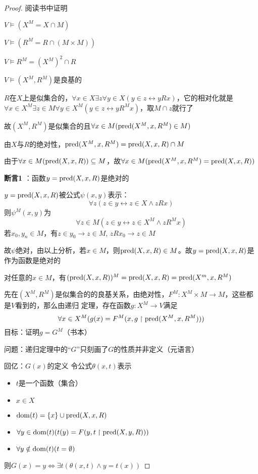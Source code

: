 \documentclass[11pt]{article}
\begin{document}
\begin{proof}
阅读书中证明

\(V\vDash(X^M=X\cap M)\)

\(V\vDash(R^M=R\cap(M\times M))\)

\(V\vDash R^M=(X^M)^2\cap R\)

\(V\vDash(X^M,R^M)\)是良基的


\(R\)在\(X\)上是似集合的，\(\forall x\in X\exists z\forall y\in X(y\in z\leftrightarrow yRx)\)，它的相对化就是
\(\forall x\in X^M\exists z\in M\forall y\in X^M(y\in z\leftrightarrow yR^Mx)\)，取\(M\cap z\)就行了

故\((X^M,R^M)\)是似集合的且\(\forall x\in M(\text{pred}(X^M,x,R^M)\in M)\)

由\(X\)与\(R\)的绝对性，\(\text{pred}(X^M,x,R^M)=\text{pred}(X,x,R)\cap M\)

由于\(\forall x\in M(\text{pred}(X,x,R))\subseteq M\)，故\(\forall x\in M(\text{pred}(X^M,x,R^M)=\text{pred}(X,x,R))\)

\textbf{断言1} ：函数\(y=\text{pred}(X,x,R)\)是绝对的

\(y=\text{pred}(X,x,R)\)被公式\(\psi(x,y)\)表示：
\begin{equation*}
\forall z(z\in y\leftrightarrow z\in X\wedge zRx)
\end{equation*}
则\(\psi^M(x,y)\)为
\begin{equation*}
\forall z\in M(z\in y\leftrightarrow z\in X^M\wedge zR^Mx)
\end{equation*}
若\(x_0,y_n\in M\)，有\(z\in y_0\to z\in M\), \(zRx_0\to z\in M\)

故\(\psi\)绝对，由以上分析，若\(x\in M\)，则\(\text{pred}(X,x,R)\in M\)。故\(y=\text{pred}(X,x,R)\)是作为函数是绝对的

对任意的\(x\in M\)，有\((\text{pred}(X,x,R))^M=\text{pred}(X,x,R)=\text{pred}(X^m,x,R^M)\)

先在\((X^M,R^M)\)是似集合的的良基关系，由绝对性，\(F^M:X^M\times M\to M\)，这些都是\(V\)看到的，那么由递归
定理，存在函数\(g:X^M\to V\)满足
\begin{equation*}
\forall x\in X^M(g(x)=F^M(x,g\upharpoonright\text{pred}(X^M,x,R^M)))
\end{equation*}
目标：证明\(g=G^M\)（书本）

问题：递归定理中的``\(G\)''只刻画了\(G\)的性质并非定义（元语言）

回亿：\(G(x)\)的定义
令公式\(\theta(x,t)\)表示
\begin{itemize}
\item \(t\)是一个函数（集合）
\item \(x\in X\)
\item \(\operatorname{dom}(t)=\{x\}\cup\text{pred}(X,x,R)\)
\item \(\forall y\in\operatorname{dom}(t)(t(y)=F(y,t\upharpoonright\text{pred}(X,y,R)))\)
\item \(\forall y\notin\operatorname{dom}(t)(t=\emptyset)\)
\end{itemize}
则\(G(x)=y\Leftrightarrow \exists t(\theta(x,t)\wedge y=t(x))\)


\end{proof}
\end{document}
